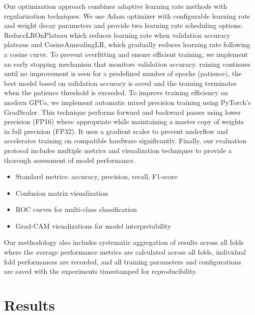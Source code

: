 \documentclass[11pt]{article}
\begin{document}
Our optimization approach combines adaptive learning rate methods with regularization techniques. We use Adam optimizer with configurable learning rate and weight decay parameters and provide two learning rate scheduling options: ReduceLROnPlateau which reduces learning rate when validation accuracy plateaus and CosineAnnealingLR, which gradually reduces learning rate following a cosine curve.
To prevent overfitting and ensure efficient training, we implement an early stopping mechanism that monitors validation accuracy. raining continues until no improvement is seen for a predefined number of epochs (patience), the best model based on validation accuracy is saved and the training terminates when the patience threshold is exceeded. To improve training efficiency on modern GPUs, we implement automatic mixed precision training using PyTorch's GradScaler. This technique performs forward and backward passes using lower precision (FP16) where appropriate while maintaining a master copy of weights in full precision (FP32). It uses a gradient scaler to prevent underflow and accelerates training on compatible hardware significantly.
Finally, our evaluation protocol includes multiple metrics and visualization techniques to provide a thorough assessment of model performance.
\begin{itemize}
    \item Standard metrics: accuracy, precision, recall, F1-score
    \item Confusion matrix visualization
    \item ROC curves for multi-class classification
    \item Grad-CAM visualizations for model interpretability
\end{itemize}
Our methodology also includes systematic aggregation of results across all folds where the average performance metrics are calculated across all folds, individual fold performances are recorded, and all training parameters and configurations are saved with the experiments timestamped for reproducibility.
\section{Results}
\end{document}
